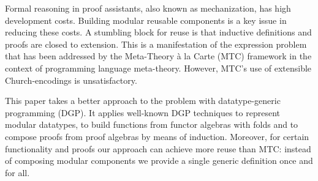 
Formal reasoning in proof assistants, also known as mechanization, has high
development costs. Building modular reusable components is a key issue in
reducing these costs. A stumbling block for reuse is that inductive definitions
and proofs are closed to extension. This is a manifestation of the expression
problem that has been addressed by the Meta-Theory \`a la Carte (MTC) framework
in the context of programming language meta-theory.
However, MTC's use of extensible
Church-encodings is unsatisfactory.

This paper takes a better approach to the problem with datatype-generic
programming (DGP). It applies well-known DGP techniques to represent modular
datatypes, to build functions from functor algebras with folds and to compose
proofs from proof algebras by means of induction. Moreover, for certain
functionality and proofs our approach can achieve more reuse than MTC: instead
of composing modular components we provide a single generic definition once and
for all.
